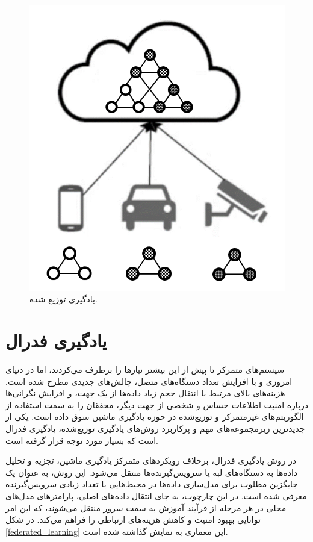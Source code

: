 \begin{figure}[t]
	\centering
	\includegraphics[scale=0.35]{images/chap1/distributed_learning.png}%
	\caption{%
		یادگیری توزیع شده.
	}
	\label{distributed_learning}
	\centering
\end{figure}

\section{یادگیری فدرال}
سیستم‌های متمرکز تا پیش از این بیشتر نیازها را برطرف می‌کردند، اما در دنیای امروزی و با افزایش تعداد دستگاه‌های متصل، چالش‌های جدیدی مطرح شده است. هزینه‌های بالای مرتبط با انتقال حجم زیاد داده‌ها از یک جهت، و افزایش نگرانی‌ها درباره امنیت اطلاعات حساس و شخصی از جهت دیگر، محققان را به سمت استفاده از الگوریتم‌های غیرمتمرکز و توزیع‌شده در حوزه یادگیری ماشین سوق داده است. یکی از جدیدترین زیرمجموعه‌های مهم و پرکاربرد روش‌های یادگیری توزیع‌شده، یادگیری فدرال است که بسیار مورد توجه قرار گرفته است.


در روش یادگیری فدرال، برخلاف رویکردهای متمرکز یادگیری ماشین، تجزیه و تحلیل داده‌ها به دستگاه‌های لبه%
یا سرویس‌گیرنده‌ها%
منتقل می‌شود. این روش، به عنوان یک جایگزین مطلوب برای مدل‌سازی داده‌ها در محیط‌هایی با تعداد زیادی سرویس‌گیرنده معرفی شده است. در این چارچوب، به جای انتقال داده‌های اصلی، پارامترهای مدل‌های محلی در هر مرحله از فرآیند آموزش به سمت سرور منتقل می‌شوند، که این امر توانایی بهبود امنیت و کاهش هزینه‌های ارتباطی را فراهم می‌کند.
در شکل
\ref{federated_learning}
این معماری به نمایش گذاشته شده است.


